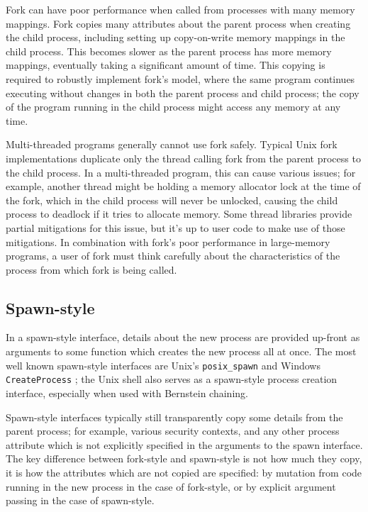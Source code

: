 \documentclass[letterpaper,twocolumn,10pt]{article}
\begin{document}
Fork can have poor performance when called from processes with many memory mappings.\cite{forkroad}
Fork copies many attributes about the parent process when creating the child process,
including setting up copy-on-write memory mappings in the child process.
This becomes slower as the parent process has more memory mappings,
eventually taking a significant amount of time.
This copying is required to robustly implement fork's model,
where the same program continues executing without changes in both the parent process and child process;
the copy of the program running in the child process might access any memory at any time.

Multi-threaded programs generally cannot use fork safely.
Typical Unix fork implementations duplicate only the thread calling fork from the parent process to the child process.
In a multi-threaded program, this can cause various issues;
for example, another thread might be holding a memory allocator lock at the time of the fork,
which in the child process will never be unlocked,
causing the child process to deadlock if it tries to allocate memory.
Some thread libraries provide partial mitigations for this issue,
but it's up to user code to make use of those mitigations.\cite{pthread_atfork}
In combination with fork's poor performance in large-memory programs,
a user of fork must think carefully
about the characteristics of the process from which fork is being called.
\subsection{Spawn-style}
In a spawn-style interface,
details about the new process are provided up-front as arguments to some function
which creates the new process all at once.
The most well known spawn-style interfaces are Unix's \texttt{posix\_spawn} \cite{posix_spawn}
and Windows \texttt{CreateProcess} \cite{create_process};
the Unix shell also serves as a spawn-style process creation interface,
especially when used with Bernstein chaining\cite{chainloading}.

Spawn-style interfaces typically still transparently copy some details from the parent process;
for example, various security contexts,
and any other process attribute which is not explicitly specified in the arguments to the spawn interface.
The key difference between fork-style and spawn-style is not how much they copy,
it is how the attributes which are not copied are specified:
by mutation from code running in the new process in the case of fork-style,
or by explicit argument passing in the case of spawn-style.
\end{document}
